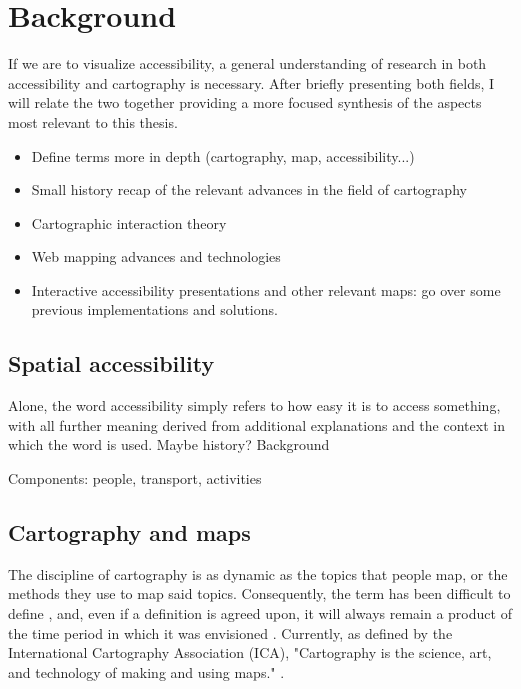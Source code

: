 \section{Background}

If we are to visualize accessibility,
a general understanding of research in both accessibility and cartography is necessary.
After briefly presenting both fields,
I will relate the two together
providing a more focused synthesis of the aspects most relevant to this thesis.

\begin{itemize}
	\item Define terms more in depth (cartography, map, accessibility...)
	\item Small history recap of the relevant advances in the field of cartography
	\item Cartographic interaction theory
	\item Web mapping advances and technologies
	\item Interactive accessibility presentations and other relevant maps: go over some previous implementations and solutions.
\end{itemize}

\subsection{Spatial accessibility}

Alone, the word accessibility simply refers to how easy it is to access something,
with all further meaning derived from
additional explanations and the context in which the word is used.
Maybe history? Background \parencite{ten2020}

Components: people, transport, activities \parencite{jar2018}


\subsection{Cartography and maps}

The discipline of cartography is as dynamic as the topics that people map,
or the methods they use to map said topics.
Consequently, the term has been difficult to define \parencite{kry1995},
and, even if a definition is agreed upon,
it will always remain a product of the time period
in which it was envisioned \parencite{tyn1992, and1996}.
Currently, as defined by the International Cartography Association (ICA), "Cartography is
the science, art, and technology of making and using maps."
\parencite{ica2019}.

